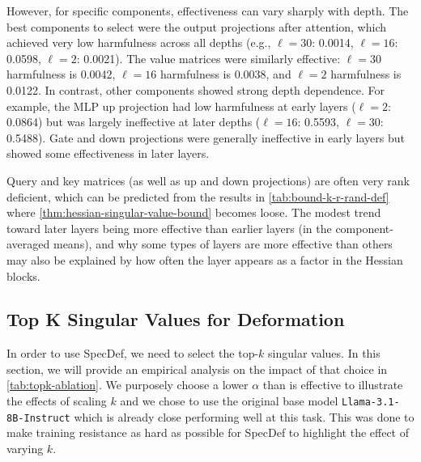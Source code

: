 \documentclass{article}
\theoremstyle{plain}
\theoremstyle{definition}
\theoremstyle{remark}
\begin{document}
However, for specific components, effectiveness can vary sharply with depth. The best components to select were the output projections after attention, which achieved very low harmfulness across all depths (e.g., $\ell=30$: 0.0014, $\ell=16$: 0.0598, $\ell=2$: 0.0021). The value matrices were similarly effective: $\ell=30$ harmfulness is 0.0042, $\ell=16$ harmfulness is 0.0038, and $\ell=2$ harmfulness is 0.0122. In contrast, other components showed strong depth dependence. For example, the MLP up projection had low harmfulness at early layers ($\ell=2$: 0.0864) but was largely ineffective at later depths ($\ell=16$: 0.5593, $\ell=30$: 0.5488). Gate and down projections were generally ineffective in early layers but showed some effectiveness in later layers.

Query and key matrices (as well as up and down projections) are often very rank deficient, which can be predicted from the results in \cref{tab:bound-k-r-rand-def} where \cref{thm:hessian-singular-value-bound} becomes loose. The modest trend toward later layers being more effective than earlier layers (in the component-averaged means), and why some types of layers are more effective than others may also be explained by how often the layer appears as a factor in the Hessian blocks.

\subsection{Top K Singular Values for Deformation}
\label{topk-singular-value-ablation}
In order to use SpecDef, we need to select the top-$k$ singular values. In this section, we will provide an empirical analysis on the impact of that choice in \cref{tab:topk-ablation}. We purposely choose a lower $\alpha$ than is effective to illustrate the effects of scaling $k$ and we chose to use the original base model \texttt{Llama-3.1-8B-Instruct} which is already close performing well at this task. This was done to make training resistance as hard as possible for SpecDef to highlight the effect of varying $k$.
\end{document}
